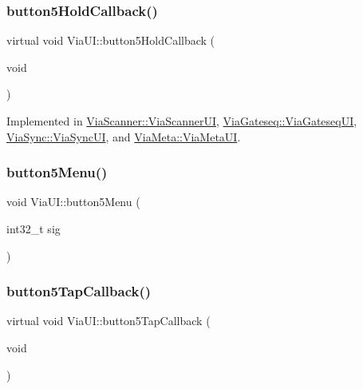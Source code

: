 \mbox{\label{class_via_u_i_aee783713c816e3807514ee9b06b571b0}} 
\subsubsection{\texorpdfstring{button5\+Hold\+Callback()}{button5HoldCallback()}}
{\footnotesize\ttfamily virtual void Via\+U\+I\+::button5\+Hold\+Callback (\begin{DoxyParamCaption}\item[{void}]{ }\end{DoxyParamCaption})\hspace{0.3cm}{\ttfamily [pure virtual]}}



Implemented in \mbox{\hyperlink{class_via_scanner_1_1_via_scanner_u_i_ac3f72c13ce77d58c5c8e7504083fbb65}{Via\+Scanner\+::\+Via\+Scanner\+UI}}, \mbox{\hyperlink{class_via_gateseq_1_1_via_gateseq_u_i_a81a66be2d7f162bf3a6cac5f10e6c019}{Via\+Gateseq\+::\+Via\+Gateseq\+UI}}, \mbox{\hyperlink{class_via_sync_1_1_via_sync_u_i_adb9159f6ba3275b089b52f9315963f2c}{Via\+Sync\+::\+Via\+Sync\+UI}}, and \mbox{\hyperlink{class_via_meta_1_1_via_meta_u_i_a225952a745a18a354c5ed3f890d8df0d}{Via\+Meta\+::\+Via\+Meta\+UI}}.

\mbox{\label{class_via_u_i_a0d3e2a3c83ad6781e9e403062131d205}} 
\subsubsection{\texorpdfstring{button5\+Menu()}{button5Menu()}}
{\footnotesize\ttfamily void Via\+U\+I\+::button5\+Menu (\begin{DoxyParamCaption}\item[{int32\+\_\+t}]{sig }\end{DoxyParamCaption})}

\mbox{\label{class_via_u_i_a5066c22385f31c24ec939d680a66a628}} 
\subsubsection{\texorpdfstring{button5\+Tap\+Callback()}{button5TapCallback()}}
{\footnotesize\ttfamily virtual void Via\+U\+I\+::button5\+Tap\+Callback (\begin{DoxyParamCaption}\item[{void}]{ }\end{DoxyParamCaption})\hspace{0.3cm}{\ttfamily [pure virtual]}}



